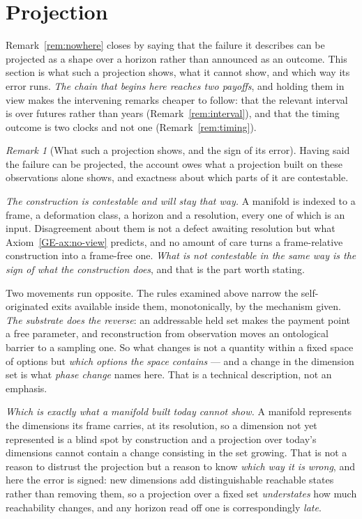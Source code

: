 \documentclass[11pt,a4paper]{article}
\theoremstyle{remark}
\newtheorem{remark}[definition]{Remark}
\begin{document}
\section{Projection}\label{sec:projection}
Remark~\ref{rem:nowhere} closes by saying that the failure it describes can be projected as a shape
over a horizon rather than announced as an outcome. This section is what such a projection shows,
what it cannot show, and which way its error runs. \emph{The chain that begins here reaches two
payoffs}, and holding them in view makes the intervening remarks cheaper to follow: that the
relevant interval is over futures rather than years (Remark~\ref{rem:interval}), and that the timing
outcome is two clocks and not one (Remark~\ref{rem:timing}).

\begin{remark}[What such a projection shows, and the sign of its error]\label{rem:phase}
Having said the failure can be projected, the account owes what a projection built on these
observations alone shows, and exactness about which parts of it are contestable.

\emph{The construction is contestable and will stay that way.} A manifold is indexed to a frame, a
deformation class, a horizon and a resolution, every one of which is an input. Disagreement about them
is not a defect awaiting resolution but what Axiom~\ref{GE-ax:no-view} predicts, and no amount of care turns a
frame-relative construction into a frame-free one. \emph{What is not contestable in the same way is the
sign of what the construction does}, and that is the part worth stating.

Two movements run opposite. The rules examined above narrow the self-originated exits available inside
them, monotonically, by the mechanism given. \emph{The substrate does the reverse}: an addressable held
set makes the payment point a free parameter, and reconstruction from observation moves an ontological
barrier to a sampling one. So what changes is not a quantity within a fixed space of options but
\emph{which options the space contains} --- and a change in the dimension set is what \emph{phase
change} names here. That is a technical description, not an emphasis.

\emph{Which is exactly what a manifold built today cannot show.} A manifold represents the dimensions
its frame carries, at its resolution, so a dimension not yet represented is a blind spot by
construction and a projection over today's dimensions cannot contain a change consisting in the set
growing. That is not a reason to distrust the projection but a reason to know \emph{which way it is
wrong}, and here the error is signed: new dimensions add distinguishable reachable states rather than
removing them, so a projection over a fixed set \emph{understates} how much reachability changes, and
any horizon read off one is correspondingly \emph{late}.


\end{remark}
\end{document}
